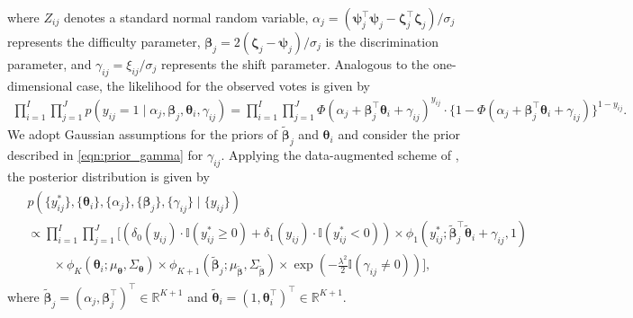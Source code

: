 \documentclass[11pt]{article}
\begin{document}
where $ Z_{ij} $ denotes a standard normal random variable, $ \alpha_j = (\boldsymbol{\psi}_j^\top \boldsymbol{\psi}_j - \boldsymbol{\zeta}_j^\top \boldsymbol{\zeta}_j)/\sigma_j $ represents the difficulty parameter, $ \boldsymbol{\beta}_j = 2(\boldsymbol{\zeta}_j - \boldsymbol{\psi}_j)/\sigma_j $ is the discrimination parameter, and $\gamma_{ij} = \xi_{ij}/\sigma_j$ represents the shift parameter.
Analogous to the one-dimensional case, the likelihood for the observed votes is given by
\begin{align}\label{eqn:like_gamma_MD}
    \prod_{i=1}^I \prod_{j=1}^J p(y_{ij} = 1 \mid \alpha_j, \boldsymbol{\beta}_j, \boldsymbol{\theta}_i, \gamma_{ij}) = \prod_{i=1}^I \prod_{j = 1}^J \Phi(\alpha_j + \boldsymbol{\beta}_j^\top \boldsymbol{\theta}_i + \gamma_{ij})^{y_{ij}} \cdot \{1-\Phi(\alpha_j + \boldsymbol{\beta}_j^\top \boldsymbol{\theta}_i + \gamma_{ij})\}^{1-y_{ij}}.
\end{align}  
We adopt Gaussian assumptions for the priors of $\tilde{\boldsymbol{\beta}}_j$ and $\boldsymbol{\theta}_i$ and consider the prior described in \eqref{eqn:prior_gamma} for $\gamma_{ij}$. 
Applying the data-augmented scheme of \cite{AlbertChib1993}, the posterior distribution is given by  
\begin{align}\label{eqn:post_l0_MD}
    \begin{split}
        &p\left(\{y_{ij}^*\}, \{\boldsymbol{\theta}_i\}, \{\alpha_j\}, \{\boldsymbol{\beta}_j\}, \{\gamma_{ij}\} \mid \{y_{ij}\}\right) \\
        &\propto \prod_{i=1}^I \prod_{j = 1}^J 
        \bigg[\left(\delta_0(y_{ij})  \cdot \mathbb{I}(y_{ij}^* \geq 0) + \delta_1(y_{ij}) \cdot \mathbb{I}(y_{ij}^* < 0) \right) \times \phi_1\left(y_{ij}^*; \tilde{\boldsymbol{\beta}}_j^\top \tilde{\boldsymbol{\theta}}_i + \gamma_{ij}, 1\right)\\
        &\quad \quad \times \phi_K\left(\boldsymbol{\theta}_i; \mu_{\boldsymbol{\theta}}, \Sigma_{\boldsymbol{\theta}} \right) \times \phi_{K+1}\left(\tilde{\boldsymbol{\beta}}_j ; \mu_{\tilde{\boldsymbol{\beta}}}, \Sigma_{\tilde{\boldsymbol{\beta}}}\right) \times \exp\left( -\frac{\lambda^2}{2} \mathbb{I}(\gamma_{ij} \neq 0)\right)\bigg],
    \end{split}
\end{align}
where $\tilde{\boldsymbol{\beta}}_j = (\alpha_j, \boldsymbol{\beta}_j^\top)^\top \in \mathbb{R}^{K+1}$ and $\tilde{\boldsymbol{\theta}}_i = (1, \boldsymbol{\theta}_i^\top)^\top \in \mathbb{R}^{K+1}$.

\end{document}
